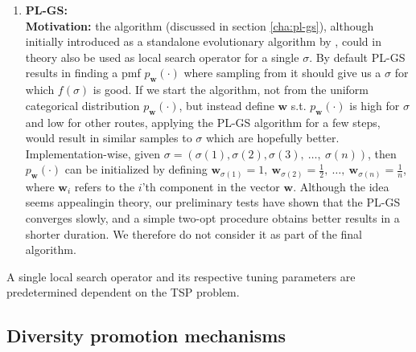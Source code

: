 \documentclass[a4paper,10pt]{article}
\newcommand{\ReplaceMe}[1]{{\color{blue}#1}}
\begin{document}
\begin{enumerate}
		\item \textbf{PL-GS:} \\
		\textbf{Motivation:} the algorithm (discussed in section \ref{cha:pl-gs}), although initially introduced as a standalone evolutionary algorithm by \citeauthor{santucci_gradient_2020}, could in theory also be used as local search operator for a single $\sigma$. By default PL-GS results in finding a pmf $p_\mathbf{w}(\cdot)$ where sampling from it should give us a $\sigma$ for which $f(\sigma)$ is good. If we start the algorithm, not from the uniform categorical distribution $p_\mathbf{w}(\cdot)$, but instead define $\mathbf{w}$ s.t. $p_\mathbf{w}(\cdot)$ is high for $\sigma$ and low for other routes, applying the PL-GS algorithm for a few steps, would result in similar samples to $\sigma$ which are hopefully better. \\
		Implementation-wise, given $\sigma = \left( \sigma(1), \sigma(2), \sigma(3),~\dots,~\sigma(n) \right)$, then $p_\mathbf{w}(\cdot)$ can be initialized by defining $\mathbf{w}_{\sigma(1)} = 1,~\mathbf{w}_{\sigma(2)} = \frac{1}{2},~\dots,~\mathbf{w}_{\sigma(n)} = \frac{1}{n}$, where $\mathbf{w}_i$ refers to the $i$'th component in the vector $\mathbf{w}$. Although the idea seems appealingin theory, our preliminary tests have shown that the PL-GS converges slowly, and a simple two-opt procedure obtains better results in a shorter duration. We therefore do not consider it as part of the final algorithm.
	\end{enumerate}
	A single local search operator and its respective tuning parameters are predetermined dependent on the TSP problem.
		



\subsection{Diversity promotion mechanisms} \label{cha:diversity}
	
\end{document}
